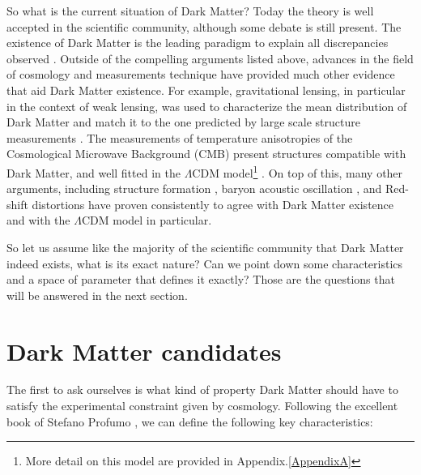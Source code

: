 So what is the current situation of Dark Matter? Today the theory is well accepted in the scientific community, although some debate is still present. The existence of Dark Matter is the leading paradigm to explain all discrepancies observed \cite{hooper}. Outside of the compelling arguments listed above, advances in the field of cosmology and measurements technique have provided much other evidence that aid Dark Matter existence. For example, gravitational lensing, in particular in the context of weak lensing, was used to characterize the mean distribution of Dark Matter and match it to the one predicted by large scale structure measurements \cite{weak-lensing}. The measurements of temperature anisotropies of the Cosmological Microwave Background (CMB) present structures compatible with Dark Matter, and well fitted in the $\Lambda$CDM model\footnote{More detail on this model are provided in Appendix.\ref{AppendixA}} \cite{Ade:2015xua}. On top of this, many other arguments, including structure formation \cite{Navarro:1995iw}, baryon acoustic oscillation \cite{bao}, and Red-shift distortions \cite{Peacock2001} have proven consistently to agree with Dark Matter existence and with the $\Lambda$CDM model in particular.

So let us assume like the majority of the scientific community that Dark Matter indeed exists, what is its exact nature? Can we point down some characteristics and a space of parameter that defines it exactly? Those are the questions that will be answered in the next section.

\section{Dark Matter candidates}
\label{ch1:sec:dm-candidates}

The first to ask ourselves is what kind of property Dark Matter should have to satisfy the experimental constraint given by cosmology. Following the excellent book of Stefano Profumo \cite{Profumo:2019ujg}, we can define the following key characteristics:

